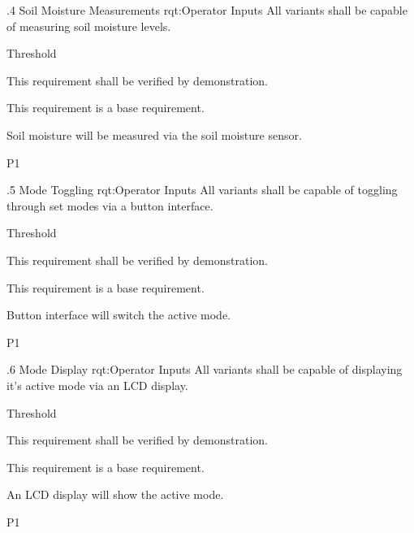 \ONERQMTVKPP
{\RqtNumberBase.4}
{Soil Moisture Measurements}
{rqt:Operator Inputs}
{All \ThisSys variants shall be capable of measuring soil moisture levels.}
{
	\item [All Phases] Threshold
}
{This requirement shall be verified by demonstration.}
{
	\item [N/A] This requirement is a base requirement.
}
{
  \item Soil moisture will be measured via the \ThisSys soil moisture sensor.
}
{P1}


\ONERQMTVKPP
{\RqtNumberBase.5}
{\ThisSys Mode Toggling}
{rqt:Operator Inputs}
{All \ThisSys variants shall be capable of toggling through set modes via a button interface.}
{
	\item [All Phases] Threshold
}
{This requirement shall be verified by demonstration.}
{
	\item [N/A] This requirement is a base requirement.
}
{
  \item Button interface will switch the active \GCS mode.
}
{P1}

\ONERQMTVKPP
{\RqtNumberBase.6}
{\ThisSys Mode Display}
{rqt:Operator Inputs}
{All \ThisSys variants shall be capable of displaying it's active mode via an LCD display.}
{
	\item [All Phases] Threshold
}
{This requirement shall be verified by demonstration.}
{
	\item [N/A] This requirement is a base requirement.
}
{
  \item An LCD display will show the active \GCS mode.
}
{P1}
